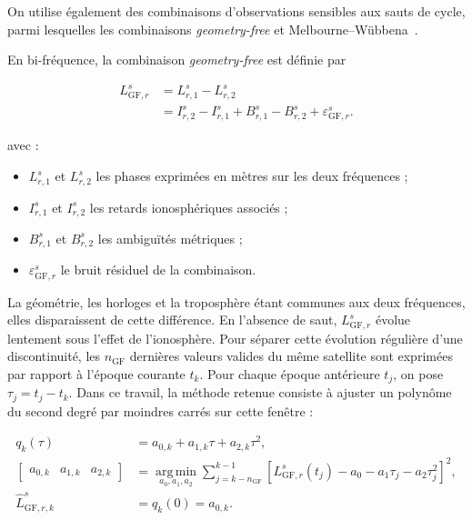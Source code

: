 On utilise également des combinaisons d'observations sensibles aux sauts de
cycle, parmi lesquelles les combinaisons \textit{geometry-free} et
Melbourne--Wübbena~\cite{blewitt1990,melbourne1985,wubbena1985}.

En bi-fréquence, la combinaison \textit{geometry-free} est définie par

\begin{align}
L_{\mathrm{GF},r}^s
&=
L_{r,1}^s-L_{r,2}^s
\\
&=
I_{r,2}^s-I_{r,1}^s
+B_{r,1}^s-B_{r,2}^s
+\varepsilon_{\mathrm{GF},r}^s.
\label{ann:eq:geometry_free_slip}
\end{align}

avec :

\begin{itemize}
    \item $L_{r,1}^s$ et $L_{r,2}^s$ les phases exprimées en mètres sur les
    deux fréquences ;
    \item $I_{r,1}^s$ et $I_{r,2}^s$ les retards ionosphériques associés ;
    \item $B_{r,1}^s$ et $B_{r,2}^s$ les ambiguïtés métriques ;
    \item $\varepsilon_{\mathrm{GF},r}^s$ le bruit résiduel de la combinaison.
\end{itemize}

La géométrie, les horloges et la troposphère étant communes aux deux
fréquences, elles disparaissent de cette différence. En l'absence de saut,
$L_{\mathrm{GF},r}^s$ évolue lentement sous l'effet de l'ionosphère. Pour
séparer cette évolution régulière d'une discontinuité, les $n_{\mathrm{GF}}$
dernières valeurs valides du même satellite sont exprimées par rapport à
l'époque courante $t_k$. Pour chaque époque antérieure $t_j$, on pose
$\tau_j=t_j-t_k$. Dans ce travail, la méthode retenue consiste à ajuster un
polynôme du second degré par moindres
carrés sur cette fenêtre :

\begin{align}
q_k(\tau)
&=
a_{0,k}+a_{1,k}\tau+a_{2,k}\tau^2,
\\
\begin{bmatrix}
a_{0,k} & a_{1,k} & a_{2,k}
\end{bmatrix}
&=
\underset{a_0,a_1,a_2}{\operatorname{arg\,min}}
\sum_{j=k-n_{\mathrm{GF}}}^{k-1}
\left[
L_{\mathrm{GF},r}^s(t_j)
-a_0-a_1\tau_j-a_2\tau_j^2
\right]^2,
\\
\widehat L_{\mathrm{GF},r,k}^s
&=
q_k(0)=a_{0,k}.
\label{ann:eq:geometry_free_prediction}
\end{align}

